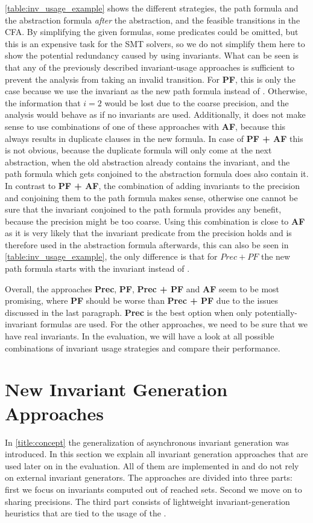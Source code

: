 \autoref{table:inv_usage_example} shows the different strategies, the path formula and the abstraction formula \emph{after} the abstraction, and the feasible transitions in the \ac{CFA}. By 
simplifying the given formulas, some predicates could be omitted, but this is an expensive task for the \ac{SMT} solvers, so we do not simplify them here to show the potential redundancy caused by 
using invariants.
What can be seen is that any of the previously described invariant-usage approaches is sufficient to prevent the analysis from taking an invalid transition. For \textbf{PF}, this is only the 
case because we use the invariant as the new path formula instead of \true{}. Otherwise, the information that $i = 2$ would be lost due to the coarse precision, and the analysis would behave as if 
no invariants are used. Additionally, it does not make sense to use combinations of one of these approaches with \textbf{AF}, because this always results in duplicate clauses in the new formula.
In  case of \textbf{PF + AF} this is not obvious, because the duplicate formula will only come at the next abstraction, when the old abstraction already contains the invariant, and the path formula which 
gets conjoined to the abstraction formula does also contain it. In contrast to \textbf{PF + AF}, the combination of adding invariants to the precision and conjoining them to the path formula makes sense, 
otherwise one cannot be sure that the invariant conjoined to the path formula provides any benefit, because the precision might be too coarse. Using this combination is close to \textbf{AF} as it is very 
likely that the invariant predicate from the precision holds and is therefore used in the abstraction formula afterwards, this can also be seen in \autoref{table:inv_usage_example}, the only difference 
is that for $Prec + PF$ the new path formula starts with the invariant instead of \true{}.

Overall, the approaches \textbf{Prec}, \textbf{PF}, \textbf{Prec + PF} and \textbf{AF} seem to be most promising, where \textbf{PF} should be worse than \textbf{Prec + PF} due to the issues discussed in 
the last paragraph. \textbf{Prec} is the best option when only potentially-invariant formulas are used. For the other approaches, we need to be sure that we have real invariants. In the evaluation, we 
will have a look at all possible combinations of invariant usage strategies and compare their performance.

\section{New Invariant Generation Approaches}
In \autoref{title:concept} the generalization of asynchronous invariant generation was introduced. In this section we explain all invariant generation approaches that are used later on in the 
evaluation. All of them are implemented in \CPAchecker{} and do not rely on external invariant generators. The approaches are divided into three parts: first we focus on invariants computed out 
of reached sets. Second we move on to sharing precisions. The third part consists of lightweight invariant-generation heuristics that are tied to the usage of the \PredicateCPA{}.

